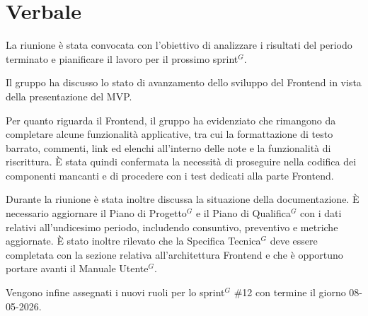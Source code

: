 \documentclass[a4paper,10pt]{article}
\begin{document}
\section*{Verbale}

La riunione è stata convocata con l'obiettivo di analizzare i risultati del periodo terminato e pianificare il lavoro per il prossimo sprint$^G$.

Il gruppo ha discusso lo stato di avanzamento dello sviluppo del Frontend in vista della presentazione del MVP.

Per quanto riguarda il Frontend, il gruppo ha evidenziato che rimangono da completare alcune funzionalità applicative, tra cui la formattazione di testo barrato, commenti, link ed elenchi all'interno delle note e la funzionalità di riscrittura. È stata quindi confermata la necessità di proseguire nella codifica dei componenti mancanti e di procedere con i test dedicati alla parte Frontend.

Durante la riunione è stata inoltre discussa la situazione della documentazione. È necessario aggiornare il Piano di Progetto$^G$ e il Piano di Qualifica$^G$ con i dati relativi all'undicesimo periodo, includendo consuntivo, preventivo e metriche aggiornate. È stato inoltre rilevato che la Specifica Tecnica$^G$ deve essere completata con la sezione relativa all'architettura Frontend e che è opportuno portare avanti il Manuale Utente$^G$.

Vengono infine assegnati i nuovi ruoli per lo sprint$^G$ \#12 con termine il giorno 08-05-2026.
\end{document}
